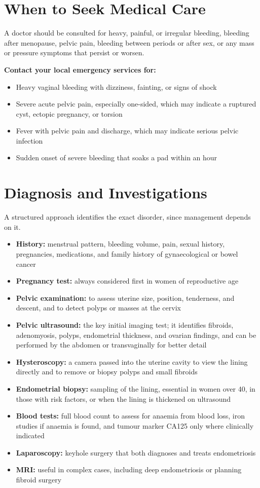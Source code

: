 \section*{When to Seek Medical Care}
A doctor should be consulted for heavy, painful, or irregular bleeding, bleeding after menopause, pelvic pain, bleeding between periods or after sex, or any mass or pressure symptoms that persist or worsen.

\textbf{Contact your local emergency services for:}
\begin{itemize}
    \item Heavy vaginal bleeding with dizziness, fainting, or signs of shock
    \item Severe acute pelvic pain, especially one-sided, which may indicate a ruptured cyst, ectopic pregnancy, or torsion
    \item Fever with pelvic pain and discharge, which may indicate serious pelvic infection
    \item Sudden onset of severe bleeding that soaks a pad within an hour
\end{itemize}

\section*{Diagnosis and Investigations}
A structured approach identifies the exact disorder, since management depends on it.

\begin{itemize}
    \item \textbf{History:} menstrual pattern, bleeding volume, pain, sexual history, pregnancies, medications, and family history of gynaecological or bowel cancer
    \item \textbf{Pregnancy test:} always considered first in women of reproductive age
    \item \textbf{Pelvic examination:} to assess uterine size, position, tenderness, and descent, and to detect polyps or masses at the cervix
    \item \textbf{Pelvic ultrasound:} the key initial imaging test; it identifies fibroids, adenomyosis, polyps, endometrial thickness, and ovarian findings, and can be performed by the abdomen or transvaginally for better detail
    \item \textbf{Hysteroscopy:} a camera passed into the uterine cavity to view the lining directly and to remove or biopsy polyps and small fibroids
    \item \textbf{Endometrial biopsy:} sampling of the lining, essential in women over 40, in those with risk factors, or when the lining is thickened on ultrasound
    \item \textbf{Blood tests:} full blood count to assess for anaemia from blood loss, iron studies if anaemia is found, and tumour marker CA125 only where clinically indicated
    \item \textbf{Laparoscopy:} keyhole surgery that both diagnoses and treats endometriosis
    \item \textbf{MRI:} useful in complex cases, including deep endometriosis or planning fibroid surgery
\end{itemize}

